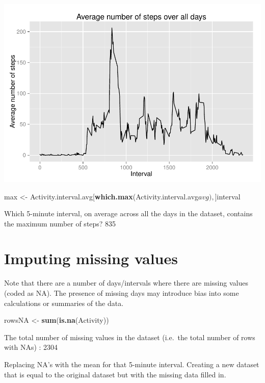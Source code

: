 \documentclass[]{article}
\newenvironment{Shaded}{\begin{snugshade}}{\end{snugshade}}
\newcommand{\KeywordTok}[1]{\textcolor[rgb]{0.13,0.29,0.53}{\textbf{{#1}}}}
\newcommand{\StringTok}[1]{\textcolor[rgb]{0.31,0.60,0.02}{{#1}}}
\newcommand{\NormalTok}[1]{{#1}}
\begin{document}
\includegraphics{PA1_template_files/figure-latex/unnamed-chunk-6-1.pdf}

\begin{Shaded}
\begin{Highlighting}[]
\NormalTok{max <-}\StringTok{ }\NormalTok{Activity.interval.avg[}\KeywordTok{which.max}\NormalTok{(Activity.interval.avg$avg),]$interval}
\end{Highlighting}
\end{Shaded}

Which 5-minute interval, on average across all the days in the dataset,
contains the maximum number of steps? 835

\section{Imputing missing values}\label{imputing-missing-values}

Note that there are a number of days/intervals where there are missing
values (coded as NA). The presence of missing days may introduce bias
into some calculations or summaries of the data.

\begin{Shaded}
\begin{Highlighting}[]
\NormalTok{rowsNA <-}\StringTok{ }\KeywordTok{sum}\NormalTok{(}\KeywordTok{is.na}\NormalTok{(Activity))}
\end{Highlighting}
\end{Shaded}

The total number of missing values in the dataset (i.e.~the total number
of rows with NAs) : 2304

Replacing NA's with the mean for that 5-minute interval. Creating a new
dataset that is equal to the original dataset but with the missing data
filled in.
\end{document}
